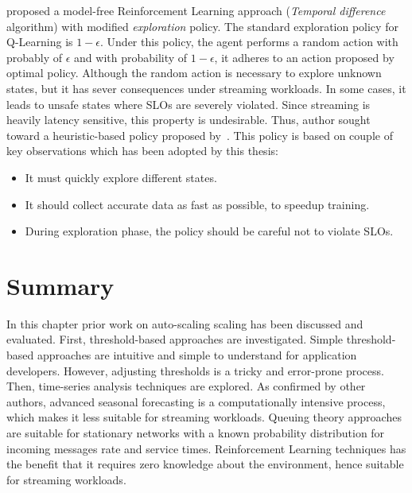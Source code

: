 \textcite{Dutreilh2010} proposed a model-free Reinforcement Learning approach (\emph{Temporal difference} algorithm) with modified \emph{exploration} policy. The standard exploration policy for Q-Learning is $1-\epsilon$. Under this policy, the agent performs a random action with probably of $\epsilon$ and with probability of $1-\epsilon$, it adheres to an action proposed by optimal policy. Although the random action is necessary to explore unknown states, but it has sever consequences under streaming workloads. In some cases, it leads to unsafe states where SLOs are severely violated. Since streaming is heavily latency sensitive, this property is undesirable. Thus, author sought toward a heuristic-based policy proposed by~\textcite{Bodik:2009}. This policy is based on couple of key observations which has been adopted by this thesis:
\begin{itemize}
    \item It must quickly explore different states.
    \item It should collect accurate data as fast as possible, to speedup training.
    \item During exploration phase, the policy should be careful not to violate SLOs.
\end{itemize}

\section{Summary}
\label{related:sum}
In this chapter prior work on auto-scaling scaling has been discussed and evaluated. First, threshold-based approaches are investigated. Simple threshold-based approaches are intuitive and simple to understand for application developers. However, adjusting thresholds is a tricky and error-prone process. Then, time-series analysis techniques are explored. As confirmed by other authors, advanced seasonal forecasting is a computationally intensive process, which makes it less suitable for streaming workloads. Queuing theory approaches are suitable for stationary networks with a known probability distribution for incoming messages rate and service times. Reinforcement Learning techniques has the benefit that it requires zero knowledge about the environment, hence suitable for streaming workloads.